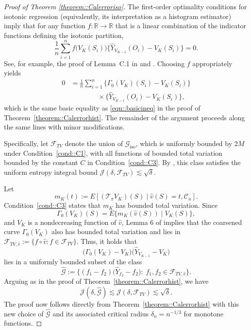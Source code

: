 \documentclass{article}
\theoremstyle{plain}
\theoremstyle{definition}
\theoremstyle{remark}
\begin{document}
\begin{proof}[Proof of Theorem \ref{theorem::Calerroriso}]
The first-order optimality conditions for isotonic regression (equivalently, its
interpretation as a histogram estimator) imply that for any function
$f:\mathbb{R}\rightarrow\mathbb{R}$ that is a linear combination of the
indicator functions defining the isotonic partition,
\begin{equation*}
\frac{1}{n}\sum_{i=1}^n
f\!\big(V_K(S_i)\big)
\Big\{
\widehat Y_{V_{K-1}}(O_i)
-
V_K(S_i)
\Big\}
= 0.
\end{equation*}
See, for example, the proof of Lemma~C.1 in \citet{van2023causal} and
\citet{van2024stabilized}. Choosing $f$ appropriately yields
\begin{align*}
0
&=
\frac{1}{n}\sum_{i=1}^n
\Big\{
\Gamma_0(V_K)(S_i) - V_K(S_i)
\Big\} \\
&\qquad\qquad\times
\Big\{
\widehat Y_{V_{K-1}}(O_i)
- V_K(S_i)
\Big\},
\end{align*}
which is the same basic equality as \eqref{eqn::basicineq} in the proof of
Theorem~\ref{theorem::Calerrorhist}. The remainder of the argument proceeds
along the same lines with minor modifications.

Specifically, let $\mathcal{F}_{TV}$ denote the union of $\mathcal G_{\mathrm{iso}}$,
which is uniformly bounded by $2M$ under Condition~\ref{cond::C1}, with all
functions of bounded total variation bounded by the constant $C$ in
Condition~\ref{cond::C3}. By \citet{van1996weak}, this class satisfies the
uniform entropy integral bound $\mathcal{J}(\delta,\mathcal{F}_{TV})
\lesssim \sqrt{\delta}$.

Let
\[
m_K(t)
:=
E\!\left[(\mathcal T_\pi V_K)(S)\mid \hat v(S)=t,\mathcal C_n\right].
\]
Condition~\ref{cond::C3} states that \(m_K\) has bounded total variation. Since
\[
\Gamma_0(V_K)(S)=E\{m_K(\hat v(S))\mid V_K(S)\},
\]
and \(V_K\) is a nondecreasing function of \(\hat v\), Lemma 6 of
\citet{van2024stabilized} implies that the coarsened curve
\(\Gamma_0(V_K)\) also has bounded total variation and lies in
\(\mathcal{F}_{TV, \hat{v}} := \{f \circ \hat{v}: f \in
\mathcal{F}_{TV}\}\). Thus, it holds that
\[
\big(\Gamma_0(V_K) - V_K\big)
\big(\widehat Y_{V_{K-1}} - V_K\big)
\]
lies in a uniformly bounded subset of the class
\[
\widehat{\mathcal{G}}
:=
\Big\{
(f_1 - f_2)\big(\widehat Y_{f_2} - f_2\big)
:\;
f_1, f_2 \in \mathcal{F}_{TV, \hat{v}}
\Big\}.
\]
Arguing as in the proof of Theorem~\ref{theorem::Calerrorhist}, we have
\[
\mathcal{J}(\delta, \widehat{\mathcal{G}})
\lesssim
\mathcal{J}(\delta, \mathcal{F}_{TV})
\lesssim
\sqrt{\delta}.
\]
The proof now follows directly from Theorem~\ref{theorem::Calerrorhist} with this
new choice of $\widehat{\mathcal{G}}$ and its associated critical radius
$\delta_n = n^{-1/3}$ for monotone functions.
\end{proof}
\end{document}
